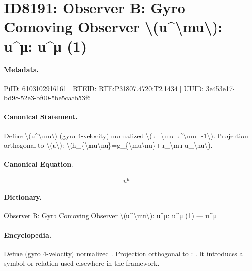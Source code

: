 \section*{ID8191: Observer B: Gyro Comoving Observer \textbackslash{}(u\textasciicircum{}\textbackslash{}mu\textbackslash{}): u\textasciicircum{}μ: u\textasciicircum{}μ (1)}
\paragraph{Metadata.}
PiID: 6103102916161 | RTEID: RTE:P31807.4720:T2.1434 | UUID: 3e453e17-bd98-52e3-bf00-5be5cacb53f6

\paragraph{Canonical Statement.}
Define \textbackslash{}(u\textasciicircum{}\textbackslash{}mu\textbackslash{}) (gyro 4-velocity) normalized \textbackslash{}(u\_\textbackslash{}mu u\textasciicircum{}\textbackslash{}mu=-1\textbackslash{}). Projection orthogonal to \textbackslash{}(u\textbackslash{}): \textbackslash{}(h\_\{\textbackslash{}mu\textbackslash{}nu\}=g\_\{\textbackslash{}mu\textbackslash{}nu\}+u\_\textbackslash{}mu u\_\textbackslash{}nu\textbackslash{}).

\paragraph{Canonical Equation.}
\[
u^\mu
\]

\paragraph{Dictionary.}
Observer B: Gyro Comoving Observer \textbackslash{}(u\textasciicircum{}\textbackslash{}mu\textbackslash{}): u\textasciicircum{}μ: u\textasciicircum{}μ (1) — u\textasciicircum{}μ

\paragraph{Encyclopedia.}
Define (gyro 4-velocity) normalized . Projection orthogonal to : . It introduces a symbol or relation used elsewhere in the framework.
